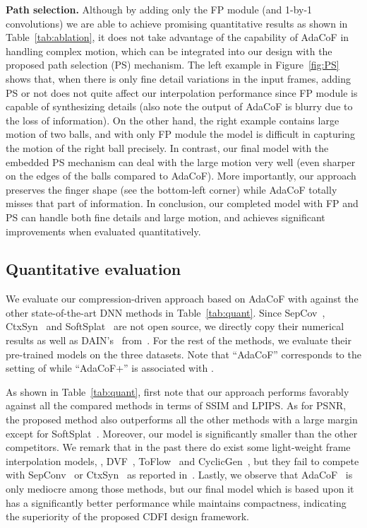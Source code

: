 \documentclass[final]{cvpr}
\newcommand{\myparagraph}[1]{\textbf{#1}}
\begin{document}
\myparagraph{Path selection.} Although by adding only the FP module (and \mbox{1-by-1} convolutions) we are able to achieve promising quantitative results as shown in Table~\ref{tab:ablation}, it does not take advantage of the capability of AdaCoF in handling complex motion, which can be integrated into our design with the proposed path selection (PS) mechanism. The left example in Figure~\ref{fig:PS} shows that, when there is only fine detail variations in the input frames, adding PS or not does not quite affect our interpolation performance since FP module is capable of synthesizing details (also note the output of AdaCoF is blurry due to the loss of information). On the other hand, the right example contains large motion of two balls, and  with only FP module the model is difficult in capturing the motion of the right ball precisely. In contrast, our final model with the embedded PS mechanism can deal with the large motion very well (even sharper on the edges of the balls compared to AdaCoF). More importantly, our approach preserves the finger shape (see the bottom-left corner) while AdaCoF totally misses that part of information. In conclusion, our completed model with FP and PS can handle both fine details and large motion, and achieves significant improvements when evaluated quantitatively.


\vspace{-.05in}
\subsection{Quantitative evaluation}
\vspace{-.05in}

We evaluate our compression-driven approach based on AdaCoF with  against the other  state-of-the-art DNN methods in Table~\ref{tab:quant}. Since SepCov~\cite{niklaus2017video_sepcov}, CtxSyn~\cite{niklaus2018context} and SoftSplat~\cite{niklaus2020softmax} are not open source, we directly copy their numerical results as well as DAIN's~\cite{bao2019depth} from~\cite{niklaus2020softmax}. For the rest of the methods, we evaluate their pre-trained models on the three datasets. Note that ``AdaCoF'' corresponds to the setting of   while ``AdaCoF+'' is associated with .

As shown in Table~\ref{tab:quant},  first note that our approach performs favorably against all the compared methods in terms of SSIM and LPIPS. As for PSNR, the proposed method also outperforms all the other methods with a large margin except for SoftSplat~\cite{niklaus2020softmax}. Moreover, our model is significantly smaller than the other competitors. We remark that in the past there do exist some light-weight frame interpolation models, \eg, DVF~\cite{liu2017video}, ToFlow~\cite{xue2019video} and CyclicGen~\cite{liu2019deep}, but they fail to compete with SepConv~\cite{niklaus2017video_sepcov} or CtxSyn~\cite{niklaus2018context} as reported in~\cite{niklaus2020softmax}. Lastly, we observe that AdaCoF~\cite{lee2020adacof} is only mediocre among those methods, but our final model which is based upon it has a significantly better performance while maintains compactness, indicating the superiority of the proposed CDFI design framework.
\end{document}
